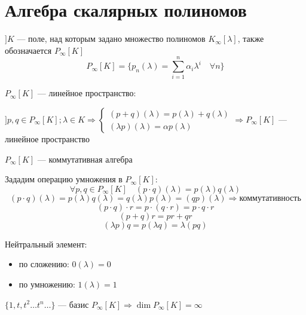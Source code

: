 

\cfoot{}



\section*{Алгебра скалярных полиномов}

$] K$ --- поле, над которым задано множество полиномов $K_\infty[\lambda]$, также обозначается $P_\infty[K]$
$$P_\infty[K]=\{p_n(\lambda)=\sum_{i=1}^n \alpha_i \lambda^i \quad \forall n\}$$

\begin{remark}
    $P_\infty[K]$ --- линейное пространство:

    $] p, q\in P_\infty[K]; \lambda\in K \Rightarrow \begin{cases}
        (p+q)(\lambda)=p(\lambda)+q(\lambda) \\
        (\lambda p)(\lambda) = \alpha p(\lambda)
    \end{cases} \Rightarrow P_\infty[K]$ --- линейное пространство
\end{remark}

\begin{remark}
    $P_\infty[K]$ --- коммутативная алгебра

    Зададим операцию умножения в $P_\infty[K]$:
    $$\forall p, q\in P_\infty[K] \quad (p\cdot q)(\lambda)=p(\lambda)q(\lambda)$$
    $$(p\cdot q)(\lambda)=p(\lambda)q(\lambda)=q(\lambda)p(\lambda)=(qp)(\lambda) \Rightarrow \text{коммутативность}$$
    $$(p\cdot q)\cdot r = p\cdot (q\cdot r) = p\cdot q\cdot r$$
    $$(p+q)r=pr+qr$$
    $$(\lambda p)q=p(\lambda q)=\lambda(pq)$$

    Нейтральный элемент:
    \begin{itemize}
        \item по сложению: $0(\lambda)=0$
        \item по умножению: $1(\lambda)=1$
    \end{itemize}
\end{remark}

\begin{remark}
    $\{1, t, t^2 \ldots t^n \ldots \}$ --- базис $P_\infty[K] \Rightarrow \dim P_\infty[K]=\infty$
\end{remark}

